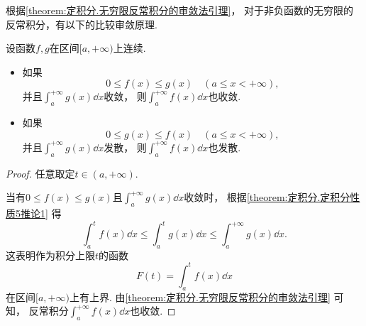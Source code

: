 根据\cref{theorem:定积分.无穷限反常积分的审敛法引理}，
对于非负函数的无穷限的反常积分，有以下的比较审敛原理.
\begin{theorem}[比较审敛原理]\label{theorem:定积分.无穷限反常积分的比较审敛原理}
设函数\(f,g\)在区间\([a,+\infty)\)上连续.
\begin{itemize}
	\item 如果\begin{equation*}
		0 \leq f(x) \leq g(x)
		\quad(a \leq x < +\infty),
	\end{equation*}
	并且\(\int_a^{+\infty} g(x) \dd{x}\)收敛，
	则\(\int_a^{+\infty} f(x) \dd{x}\)也收敛.

	\item 如果\begin{equation*}
		0 \leq g(x) \leq f(x)
		\quad(a \leq x < +\infty),
	\end{equation*}
	并且\(\int_a^{+\infty} g(x) \dd{x}\)发散，
	则\(\int_a^{+\infty} f(x) \dd{x}\)也发散.
\end{itemize}
\begin{proof}
任意取定\(t \in (a,+\infty)\).

当有\(0 \leq f(x) \leq g(x)\)且\(\int_a^{+\infty} g(x) \dd{x}\)收敛时，
根据\cref{theorem:定积分.定积分性质5推论1}
得\begin{equation*}
	\int_a^t f(x) \dd{x}
	\leq
	\int_a^t g(x) \dd{x}
	\leq
	\int_a^{+\infty} g(x) \dd{x}.
\end{equation*}
这表明作为积分上限\(t\)的函数\begin{equation*}
	F(t) = \int_a^t f(x) \dd{x}
\end{equation*}
在区间\([a,+\infty)\)上有上界.
由\cref{theorem:定积分.无穷限反常积分的审敛法引理} 可知，
反常积分\(\int_a^{+\infty} f(x) \dd{x}\)也收敛.
\end{proof}
\end{theorem}


